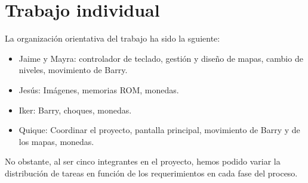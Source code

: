 \documentclass[11pt, a4paper, spanish, openright, twoside]{book}
\begin{document}
\section{Trabajo individual}
La organización orientativa del trabajo ha sido la sguiente:
\begin{itemize}
\item Jaime y Mayra: controlador de teclado, gestión y diseño de mapas, cambio de niveles, movimiento de Barry.
\item Jesús: Imágenes, memorias ROM, monedas.
\item Iker: Barry, choques, monedas.
\item Quique: Coordinar el proyecto, pantalla principal, movimiento de Barry y de los mapas, monedas.
\end{itemize}
No obstante, al ser cinco integrantes en el proyecto, hemos podido variar la distribución de tareas en función de los requerimientos en cada fase del proceso. 
\end{document}
